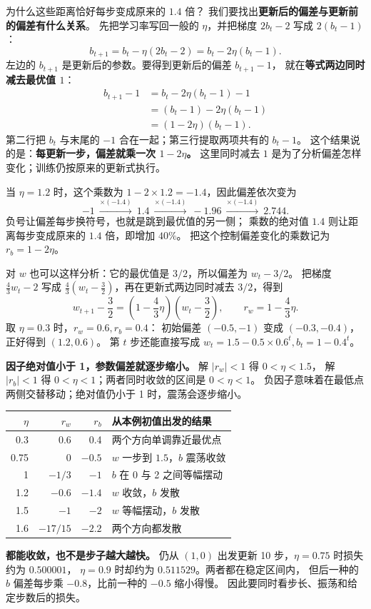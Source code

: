为什么这些距离恰好每步变成原来的 $1.4$ 倍？
我们要找出\textbf{更新后的偏差与更新前的偏差有什么关系}。
先把学习率写回一般的 $\eta$，并把梯度 $2b_t-2$ 写成 $2(b_t-1)$：
\[
b_{t+1}=b_t-\eta(2b_t-2)=b_t-2\eta(b_t-1).
\]
左边的 $b_{t+1}$ 是更新后的参数。要得到更新后的偏差 $b_{t+1}-1$，
就在\textbf{等式两边同时减去最优值 $1$}：
\[
\begin{aligned}
b_{t+1}-1
&=b_t-2\eta(b_t-1)-1\\
&=(b_t-1)-2\eta(b_t-1)\\
&=(1-2\eta)(b_t-1).
\end{aligned}
\]
第二行把 $b_t$ 与末尾的 $-1$ 合在一起；第三行提取两项共有的 $b_t-1$。
这个结果说的是：\textbf{每更新一步，偏差就乘一次 $1-2\eta$。}
这里同时减去 $1$ 是为了分析偏差怎样变化；训练仍按原来的更新式执行。

当 $\eta=1.2$ 时，这个乘数为 $1-2\times1.2=-1.4$，因此偏差依次变为
\[
-1\ \xrightarrow{\times(-1.4)}\ 1.4
\ \xrightarrow{\times(-1.4)}\ -1.96
\ \xrightarrow{\times(-1.4)}\ 2.744.
\]
负号让偏差每步换符号，也就是跳到最优值的另一侧；
乘数的绝对值 $1.4$ 则让距离每步变成原来的 $1.4$ 倍，即增加 $40\%$。
把这个控制偏差变化的乘数记为 $r_b=1-2\eta$。

对 $w$ 也可以这样分析：它的最优值是 $3/2$，所以偏差为 $w_t-3/2$。
把梯度 $\frac43w_t-2$ 写成 $\frac43(w_t-\frac32)$，再在更新式两边同时减去 $3/2$，得到
\[
w_{t+1}-\frac32=\left(1-\frac43\eta\right)\left(w_t-\frac32\right),
\qquad r_w=1-\frac43\eta.
\]
取 $\eta=0.3$ 时，$r_w=0.6,r_b=0.4$：
初始偏差 $(-0.5,-1)$ 变成 $(-0.3,-0.4)$，正好得到 $(1.2,0.6)$。
第 $t$ 步还能直接写成 $w_t=1.5-0.5\times0.6^t,b_t=1-0.4^t$。

\textbf{因子绝对值小于 1，参数偏差就逐步缩小。}
解 $|r_w|<1$ 得 $0<\eta<1.5$，
解 $|r_b|<1$ 得 $0<\eta<1$；两者同时收敛的区间是 $\boxed{0<\eta<1}$。
负因子意味着在最低点两侧交替移动；绝对值仍小于 1 时，震荡会逐步缩小。
\begin{center}\small
{}
\begin{tabularx}{\linewidth}{@{}rrrX@{}}
\toprule
$\eta$ & $r_w$ & $r_b$ & 从本例初值出发的结果\\\midrule
0.3 & 0.6 & 0.4 & 两个方向单调靠近最优点\\
0.75 & 0 & $-0.5$ & $w$ 一步到 $1.5$，$b$ 震荡收敛\\
1 & $-1/3$ & $-1$ & $b$ 在 0 与 2 之间等幅摆动\\
1.2 & $-0.6$ & $-1.4$ & $w$ 收敛，$b$ 发散\\
1.5 & $-1$ & $-2$ & $w$ 等幅摆动，$b$ 发散\\
1.6 & $-17/15$ & $-2.2$ & 两个方向都发散\\
\bottomrule
\end{tabularx}
\end{center}
\textbf{都能收敛，也不是步子越大越快。}
仍从 $(1,0)$ 出发更新 10 步，$\eta=0.75$ 时损失约为 $0.500001$，
$\eta=0.9$ 时却约为 $0.511529$。两者都在稳定区间内，
但后一种的 $b$ 偏差每步乘 $-0.8$，比前一种的 $-0.5$ 缩小得慢。
因此要同时看步长、振荡和给定步数后的损失。

